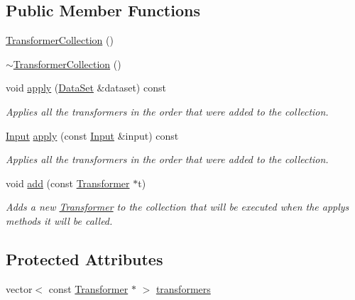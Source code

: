 \subsection*{Public Member Functions}
\begin{DoxyCompactItemize}
\item 
\hyperlink{classhappyml_1_1TransformerCollection_ab994ad8673d0d966d5eb40057312d5d4}{Transformer\+Collection} ()
\item 
\hyperlink{classhappyml_1_1TransformerCollection_abde2c02d4e68015d0dd86c15fc3f8dd3}{$\sim$\+Transformer\+Collection} ()
\item 
void \hyperlink{classhappyml_1_1TransformerCollection_a20fd27b57eb8fa4546e3664ea33283f1}{apply} (\hyperlink{classhappyml_1_1DataSet}{Data\+Set} \&dataset) const 
\begin{DoxyCompactList}\small\item\em Applies all the transformers in the order that were added to the collection. \end{DoxyCompactList}\item 
\hyperlink{namespacehappyml_a03602d1ec49393790b8a0449f40cd01f}{Input} \hyperlink{classhappyml_1_1TransformerCollection_a36511b731522cda1cadbe3fa4299f6bf}{apply} (const \hyperlink{namespacehappyml_a03602d1ec49393790b8a0449f40cd01f}{Input} \&input) const 
\begin{DoxyCompactList}\small\item\em Applies all the transformers in the order that were added to the collection. \end{DoxyCompactList}\item 
void \hyperlink{classhappyml_1_1TransformerCollection_a443ff8b53921d921765b0396d17037e4}{add} (const \hyperlink{classhappyml_1_1Transformer}{Transformer} $\ast$t)
\begin{DoxyCompactList}\small\item\em Adds a new \hyperlink{classhappyml_1_1Transformer}{Transformer} to the collection that will be executed when the apply\textquotesingle{}s methods it will be called. \end{DoxyCompactList}\end{DoxyCompactItemize}
\subsection*{Protected Attributes}
\begin{DoxyCompactItemize}
\item 
vector$<$ const \hyperlink{classhappyml_1_1Transformer}{Transformer} $\ast$ $>$ \hyperlink{classhappyml_1_1TransformerCollection_a90c2b12199efa361dedf28f01a72d9ff}{transformers}
\end{DoxyCompactItemize}


